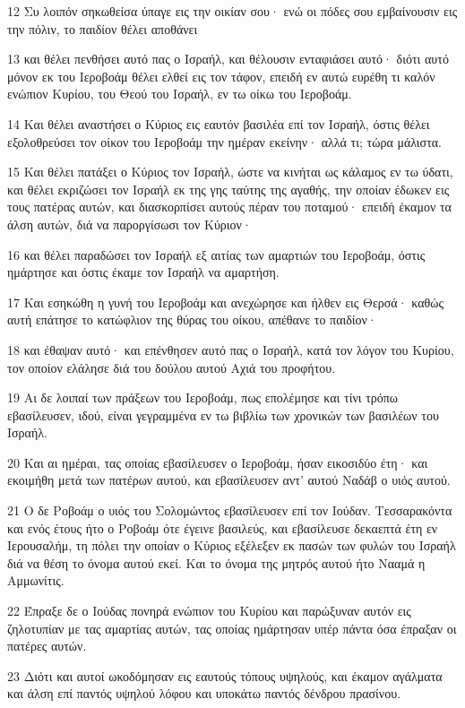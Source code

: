 \par 12 Συ λοιπόν σηκωθείσα ύπαγε εις την οικίαν σου· ενώ οι πόδες σου εμβαίνουσιν εις την πόλιν, το παιδίον θέλει αποθάνει
\par 13 και θέλει πενθήσει αυτό πας ο Ισραήλ, και θέλουσιν ενταφιάσει αυτό· διότι αυτό μόνον εκ του Ιεροβοάμ θέλει ελθεί εις τον τάφον, επειδή εν αυτώ ευρέθη τι καλόν ενώπιον Κυρίου, του Θεού του Ισραήλ, εν τω οίκω του Ιεροβοάμ.
\par 14 Και θέλει αναστήσει ο Κύριος εις εαυτόν βασιλέα επί τον Ισραήλ, όστις θέλει εξολοθρεύσει τον οίκον του Ιεροβοάμ την ημέραν εκείνην· αλλά τι; τώρα μάλιστα.
\par 15 Και θέλει πατάξει ο Κύριος τον Ισραήλ, ώστε να κινήται ως κάλαμος εν τω ύδατι, και θέλει εκριζώσει τον Ισραήλ εκ της γης ταύτης της αγαθής, την οποίαν έδωκεν εις τους πατέρας αυτών, και διασκορπίσει αυτούς πέραν του ποταμού· επειδή έκαμον τα άλση αυτών, διά να παροργίσωσι τον Κύριον·
\par 16 και θέλει παραδώσει τον Ισραήλ εξ αιτίας των αμαρτιών του Ιεροβοάμ, όστις ημάρτησε και όστις έκαμε τον Ισραήλ να αμαρτήση.
\par 17 Και εσηκώθη η γυνή του Ιεροβοάμ και ανεχώρησε και ήλθεν εις Θερσά· καθώς αυτή επάτησε το κατώφλιον της θύρας του οίκου, απέθανε το παιδίον·
\par 18 και έθαψαν αυτό· και επένθησεν αυτό πας ο Ισραήλ, κατά τον λόγον του Κυρίου, τον οποίον ελάλησε διά του δούλου αυτού Αχιά του προφήτου.
\par 19 Αι δε λοιπαί των πράξεων του Ιεροβοάμ, πως επολέμησε και τίνι τρόπω εβασίλευσεν, ιδού, είναι γεγραμμένα εν τω βιβλίω των χρονικών των βασιλέων του Ισραήλ.
\par 20 Και αι ημέραι, τας οποίας εβασίλευσεν ο Ιεροβοάμ, ήσαν εικοσιδύο έτη· και εκοιμήθη μετά των πατέρων αυτού, και εβασίλευσεν αντ' αυτού Ναδάβ ο υιός αυτού.
\par 21 Ο δε Ροβοάμ ο υιός του Σολομώντος εβασίλευσεν επί τον Ιούδαν. Τεσσαρακόντα και ενός έτους ήτο ο Ροβοάμ ότε έγεινε βασιλεύς, και εβασίλευσε δεκαεπτά έτη εν Ιερουσαλήμ, τη πόλει την οποίαν ο Κύριος εξέλεξεν εκ πασών των φυλών του Ισραήλ διά να θέση το όνομα αυτού εκεί. Και το όνομα της μητρός αυτού ήτο Νααμά η Αμμωνίτις.
\par 22 Έπραξε δε ο Ιούδας πονηρά ενώπιον του Κυρίου και παρώξυναν αυτόν εις ζηλοτυπίαν με τας αμαρτίας αυτών, τας οποίας ημάρτησαν υπέρ πάντα όσα έπραξαν οι πατέρες αυτών.
\par 23 Διότι και αυτοί ωκοδόμησαν εις εαυτούς τόπους υψηλούς, και έκαμον αγάλματα και άλση επί παντός υψηλού λόφου και υποκάτω παντός δένδρου πρασίνου.
